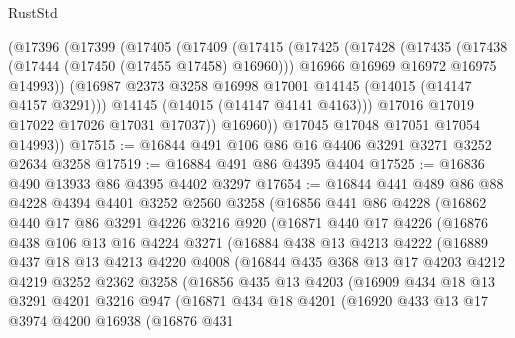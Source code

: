 \begin{lexlean}{RustStd}
\begin{coremodule}
      (@17396
        (@17399
          (@17405
            (@17409
              (@17415
                (@17425
                  (@17428
                    (@17435
                      (@17438 (@17444 (@17450 (@17455 @17458) @16960)))
                      @16966
                      @16969
                      @16972
                      @16975
                      @14993))
                  (@16987 @2373 @3258 @16998 @17001 @14145 (@14015 (@14147 @4157 @3291)))
                  @14145
                  (@14015 (@14147 @4141 @4163)))
                @17016
                @17019
                @17022
                @17026
                @17031
                @17037))
            @16960))
        @17045
        @17048
        @17051
        @17054
        @14993))
@17515 := @16844 @491 @106 @86 @16 @4406 @3291 @3271 @3252 @2634 @3258
@17519 := @16884 @491 @86 @4395 @4404
@17525 := @16836 @490 @13933 @86 @4395 @4402 @3297
@17654 := @16844
    @441
    @489
    @86
    @88
    @4228
    @4394
    @4401
    @3252
    @2560
    @3258
    (@16856
      @441
      @86
      @4228
      (@16862
        @440
        @17
        @86
        @3291
        @4226
        @3216
        @920
        (@16871
          @440
          @17
          @4226
          (@16876
            @438
            @106
            @13
            @16
            @4224
            @3271
            (@16884
              @438
              @13
              @4213
              @4222
              (@16889
                @437
                @18
                @13
                @4213
                @4220
                @4008
                (@16844
                  @435
                  @368
                  @13
                  @17
                  @4203
                  @4212
                  @4219
                  @3252
                  @2362
                  @3258
                  (@16856
                    @435
                    @13
                    @4203
                    (@16909
                      @434
                      @18
                      @13
                      @3291
                      @4201
                      @3216
                      @947
                      (@16871
                        @434
                        @18
                        @4201
                        (@16920
                          @433
                          @13
                          @17
                          @3974
                          @4200
                          @16938
                          (@16876
                            @431

\end{coremodule}
\end{lexlean}
